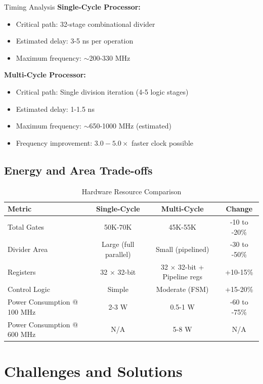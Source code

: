 \documentclass[a4paper, 11pt]{article}
\begin{document}
\begin{myblock}{Timing Analysis}
\textbf{Single-Cycle Processor:}
\begin{itemize}
    \item Critical path: 32-stage combinational divider
    \item Estimated delay: 3-5 ns per operation
    \item Maximum frequency: $\sim$200-330 MHz
\end{itemize}

\textbf{Multi-Cycle Processor:}
\begin{itemize}
    \item Critical path: Single division iteration (4-5 logic stages)
    \item Estimated delay: 1-1.5 ns
    \item Maximum frequency: $\sim$650-1000 MHz (estimated)
    \item Frequency improvement: $3.0-5.0\times$ faster clock possible
\end{itemize}
\end{myblock}

\subsection{Energy and Area Trade-offs}

\begin{table}[H]
\centering
\caption{Hardware Resource Comparison}
\begin{tabular}{|l|c|c|c|}
\hline
\textbf{Metric} & \textbf{Single-Cycle} & \textbf{Multi-Cycle} & \textbf{Change} \\
\hline
Total Gates & 50K-70K & 45K-55K & -10 to -20\% \\
\hline
Divider Area & Large (full parallel) & Small (pipelined) & -30 to -50\% \\
\hline
Registers & 32 × 32-bit & 32 × 32-bit + Pipeline regs & +10-15\% \\
\hline
Control Logic & Simple & Moderate (FSM) & +15-20\% \\
\hline
Power Consumption @ 100 MHz & 2-3 W & 0.5-1 W & -60 to -75\% \\
\hline
Power Consumption @ 600 MHz & N/A & 5-8 W & N/A \\
\hline
\end{tabular}
\end{table}

\newpage

\section{Challenges and Solutions}
\end{document}
